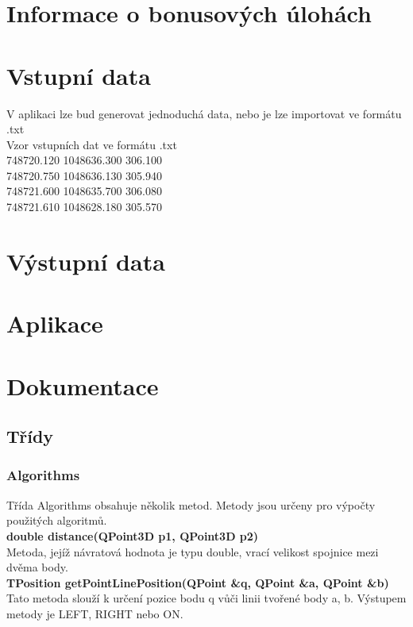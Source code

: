 \documentclass[a4paper, 12pt]{article}
\begin{document}
\section{Informace o bonusových úlohách}


\section{Vstupní data}
V aplikaci lze bud generovat jednoduchá data, nebo je lze importovat ve formátu .txt\\

Vzor vstupních dat ve formátu .txt\\
 748720.120    1048636.300     306.100\\
 748720.750    1048636.130     305.940\\
 748721.600    1048635.700     306.080\\
 748721.610    1048628.180     305.570\\

\section{Výstupní data}

\section{Aplikace}


\section{Dokumentace}
\subsection{Třídy}
\subsubsection{Algorithms}
Třída Algorithms obsahuje několik metod. Metody jsou určeny pro výpočty použitých algoritmů.
\\

\textbf{double distance(QPoint3D p1, QPoint3D p2)}\\
Metoda, jejíž návratová hodnota je typu double, vrací velikost spojnice mezi dvěma body.
\\

\textbf{TPosition getPointLinePosition(QPoint \&q, QPoint \&a, QPoint \&b)}\\
Tato metoda slouží k určení pozice bodu q vůči linii tvořené body a, b. Výstupem metody je LEFT, RIGHT nebo ON.\\
\end{document}
